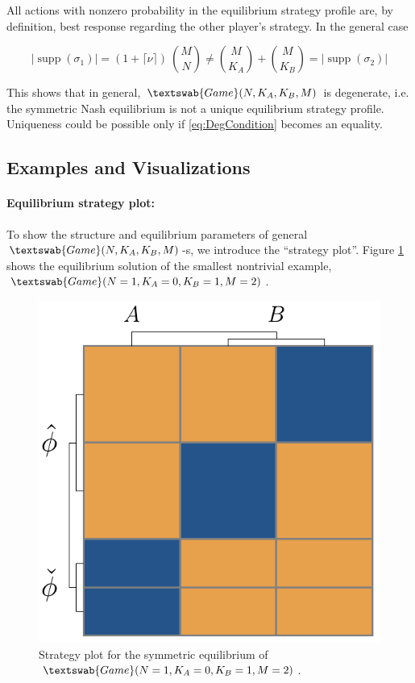 \documentclass{article}
\theoremstyle{definition}
\newcommand{\G}[1]{$\textswab{Game}(#1)$}
\DeclareMathOperator\supp{supp}
\begin{document}
All actions with nonzero probability in the equilibrium strategy profile are, by definition, best response regarding the other player's strategy. In the general case

\begin{equation}
    \label{eq:DegCondition}
    |\supp(\sigma_1)| = (1 + \lceil \nu \rceil) \ \binom{M}{N} \ne \binom{M}{K_A} + \binom{M}{K_B} = |\supp(\sigma_2)| 
\end{equation}

This shows that in general, \G{N,K_A,K_B,M} is degenerate, i.e. the symmetric Nash equilibrium is not a unique equilibrium strategy profile. Uniqueness could be possible only if \eqref{eq:DegCondition} becomes an equality.

\subsection{Examples and Visualizations}

\paragraph{Equilibrium strategy plot:}

To show the structure and equilibrium parameters of general \G{N,K_A,K_B,M}-s, we introduce the ``strategy plot''. Figure \ref{fig:StrategyPlot_1012} shows the equilibrium solution of the smallest nontrivial example, \G{N=1,K_A=0,K_B=1,M=2}.

\begin{figure}[H]
    \centering
    \includegraphics[width=6 cm]{img/StrategyPlot_1012.pdf}
    \caption{Strategy plot for the symmetric equilibrium of \G{N=1,K_A=0,K_B=1,M=2}.}
    \label{fig:StrategyPlot_1012}
\end{figure}
\end{document}
